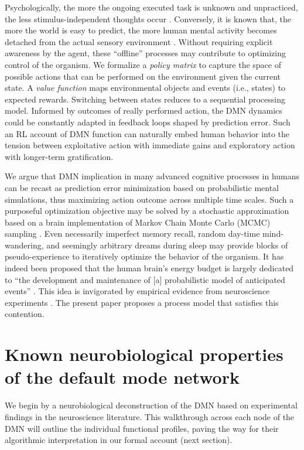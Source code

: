 \documentclass[10pt,letterpaper]{article}
\begin{document}
Psychologically,
the more the ongoing executed task is unknown and unpracticed,
the less stimulus-independent thoughts occur
\citep{filler1973daydreaming, teasdale1995stimulus, christoff2016mind}.
Conversely,
it is known that, the more the world is easy to predict,
the more human mental activity
becomes detached from the actual sensory environment
\citep{antrobus1966studies, pope1978regulation}.
Without requiring explicit awareness by the agent,
these ``offline'' processes may contribute
to optimizing control of the organism.
We formalize
a \textit{policy matrix} to capture the space of possible actions that can be performed
on the environment given the current state. A \textit{value function}
maps environmental objects and events (i.e., states) to expected rewards.
Switching between states reduces to a sequential processing model.
Informed by outcomes of really performed action,
the DMN dynamics could be constantly adapted in feedback loops
shaped by prediction error.
Such an RL account of DMN function can naturally embed human behavior
into the tension between exploitative action with immediate gains and
exploratory action with longer-term gratification.



We argue that DMN implication in many
advanced cognitive processes in humans
can be recast as prediction error minimization
based on probabilistic mental simulations,
thus maximizing action outcome across multiple time scales.
Such a purposeful optimization objective
may be solved by a stochastic approximation
based on a brain implementation of Markov Chain Monte Carlo (MCMC) sampling
\citep{tenenbaum2011grow}.
Even necessarily imperfect memory recall,
random day-time mind-wandering, and
seemingly arbitrary dreams during sleep
may provide blocks of pseudo-experience to iteratively
optimize the behavior of the organism.
%
It has indeed been proposed that
the human brain's energy budget is largely dedicated to
``the development and maintenance of [a]
probabilistic model of anticipated events''
\citep{raichle2005intrinsic}.
This idea is invigorated by
empirical evidence from
neuroscience experiments \citep{kording2004bayesian, fiser2004small}.
The present paper proposes a
process model that satisfies this contention.




\section{Known neurobiological properties of the default mode network}
We begin by a neurobiological deconstruction of the DMN
based on experimental findings in the neuroscience literature.
This walkthrough across each node of the DMN will
outline the individual functional profiles,
paving the way for their algorithmic interpretation
in our formal account (next section).
\end{document}
